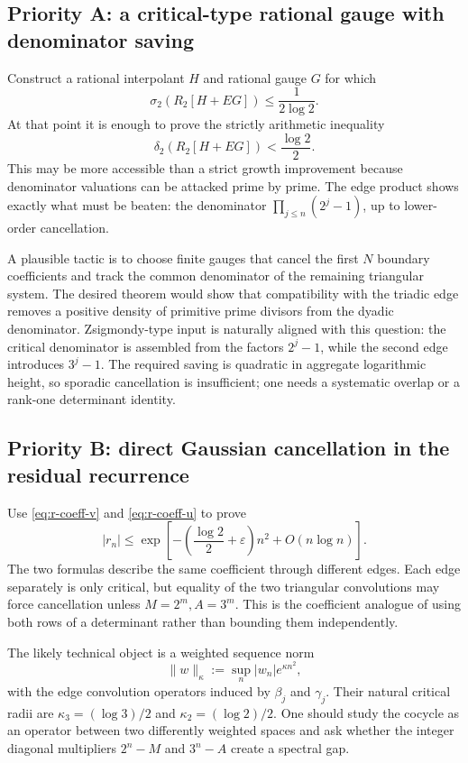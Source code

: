 \documentclass[11pt]{article}
\theoremstyle{definition}
\begin{document}
\subsection{Priority A: a critical-type rational gauge with denominator saving}

Construct a rational interpolant \(H\) and rational gauge \(G\) for which
\[
  \sigma_2(R_2[H+EG])\le\frac1{2\log2}.
\]
At that point it is enough to prove the strictly arithmetic inequality
\[
  \delta_2(R_2[H+EG])<\frac{\log2}{2}.
\]
This may be more accessible than a strict growth improvement because denominator valuations can be attacked prime by prime.  The edge product shows exactly what must be beaten: the denominator \(\prod_{j\le n}(2^j-1)\), up to lower-order cancellation.

A plausible tactic is to choose finite gauges that cancel the first \(N\) boundary coefficients and track the common denominator of the remaining triangular system.  The desired theorem would show that compatibility with the triadic edge removes a positive density of primitive prime divisors from the dyadic denominator.  Zsigmondy-type input is naturally aligned with this question: the critical denominator is assembled from the factors \(2^j-1\), while the second edge introduces \(3^j-1\).  The required saving is quadratic in aggregate logarithmic height, so sporadic cancellation is insufficient; one needs a systematic overlap or a rank-one determinant identity.

\subsection{Priority B: direct Gaussian cancellation in the residual recurrence}

Use \eqref{eq:r-coeff-v} and \eqref{eq:r-coeff-u} to prove
\[
  |r_n|\le
  \exp\left[-\left(\frac{\log2}{2}+\varepsilon\right)n^2+O(n\log n)\right].
\]
The two formulas describe the same coefficient through different edges.  Each edge separately is only critical, but equality of the two triangular convolutions may force cancellation unless \(M=2^m,A=3^m\).  This is the coefficient analogue of using both rows of a determinant rather than bounding them independently.

The likely technical object is a weighted sequence norm
\[
  \|w\|_{\kappa}:=\sup_n |w_n|e^{\kappa n^2},
\]
with the edge convolution operators induced by \(\beta_j\) and \(\gamma_j\).  Their natural critical radii are \(\kappa_3=(\log3)/2\) and \(\kappa_2=(\log2)/2\).  One should study the cocycle as an operator between two differently weighted spaces and ask whether the integer diagonal multipliers \(2^n-M\) and \(3^n-A\) create a spectral gap.
\end{document}
